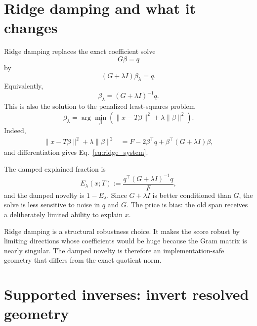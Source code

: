 \documentclass[10pt,twocolumn]{article}
\begin{document}
\section{Ridge damping and what it changes}

Ridge damping replaces the exact coefficient solve
\begin{equation}
G\beta=q
\end{equation}
by
\begin{equation}
(G+\lambda I)\beta_\lambda=q.
\label{eq:ridge_system}
\end{equation}
Equivalently,
\begin{equation}
\beta_\lambda=(G+\lambda I)^{-1}q.
\label{eq:ridge_coefficients}
\end{equation}
This is also the solution to the penalized least-squares problem
\begin{equation}
\beta_\lambda
=\arg\min_\beta
\left(\|x-T\beta\|^2+\lambda\|\beta\|^2\right).
\label{eq:ridge_ls}
\end{equation}
Indeed,
\begin{align}
\|x-T\beta\|^2+\lambda\|\beta\|^2
&=F-2\beta^\top q+\beta^\top(G+\lambda I)\beta,
\end{align}
and differentiation gives Eq.~\eqref{eq:ridge_system}.

The damped explained fraction is
\begin{equation}
E_\lambda(x;T):=\frac{q^\top(G+\lambda I)^{-1}q}{F},
\label{eq:damped_explained_fraction}
\end{equation}
and the damped novelty is $1-E_\lambda$. Since $G+\lambda I$ is better conditioned than $G$, the solve is less sensitive to noise in $q$ and $G$. The price is bias: the old span receives a deliberately limited ability to explain $x$.

\begin{cautionbox}
Ridge damping is a structural robustness choice. It makes the score robust by limiting directions whose coefficients would be huge because the Gram matrix is nearly singular. The damped novelty is therefore an implementation-safe geometry that differs from the exact quotient norm.
\end{cautionbox}

\section{Supported inverses: invert resolved geometry}
\end{document}
